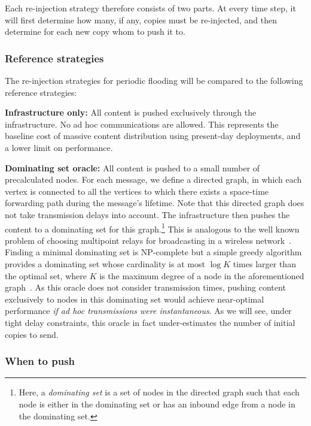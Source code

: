 \documentclass[preprint]{elsarticle}
\begin{document}
Each re-injection strategy therefore consists of two parts. At every time step, it will first determine how many, if any, copies must be re-injected, and then determine for each new copy whom to push it to.

\subsubsection{Reference strategies}
\label{subsubsec:benchmarking}

The re-injection strategies for periodic flooding will be compared to the following reference strategies:

\smallskip\noindent\textbf{Infrastructure only:} All content is pushed exclusively through the infrastructure. No ad hoc communications are allowed. This represents the baseline cost of massive content distribution using present-day deployments, and a lower limit on performance.

\smallskip\noindent\textbf{Dominating set oracle:} All content is pushed to a small number of precalculated nodes. For each message, we define a directed graph, in which each vertex is connected to all the vertices to which there exists a space-time forwarding path during the message's lifetime. Note that this directed graph does not take transmission delays into account. The infrastructure then pushes the content to a dominating set for this graph.\footnote{Here, a \textit{dominating set} is a set of nodes in the directed graph such that each node is either in the dominating set or has an inbound edge from a node in the dominating set.}  This is analogous to the well known problem of choosing multipoint relays for broadcasting in a wireless network~\cite{laouiti2001}. Finding a minimal dominating set is NP-complete but a simple greedy algorithm provides a dominating set whose cardinality is at most $\log K$ times larger than the optimal set, where $K$ is the maximum degree of a node in the aforementioned graph~\cite{laouiti2001}. As this oracle does not consider transmission times, pushing content exclusively to nodes in this dominating set would achieve near-optimal performance \textit{if ad hoc transmissions were instantaneous}. As we will see, under tight delay constraints, this oracle in fact under-estimates the number of initial copies to send.

\subsubsection{When to push}
\label{subsubsec:when}
\end{document}
